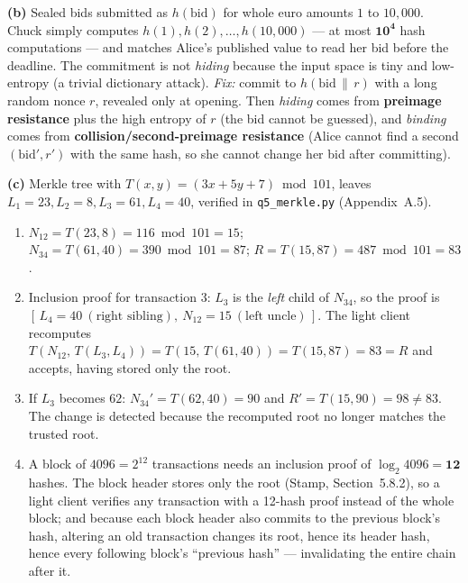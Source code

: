 \documentclass[11pt,a4paper]{article}
\begin{document}
\textbf{(b)} Sealed bids submitted as $h(\text{bid})$ for whole euro amounts $1$ to $10{,}000$. Chuck
simply computes $h(1),h(2),\dots,h(10{,}000)$ --- at most $\mathbf{10^{4}}$ hash computations --- and
matches Alice's published value to read her bid before the deadline. The commitment is not
\emph{hiding} because the input space is tiny and low-entropy (a trivial dictionary attack). \emph{Fix:}
commit to $h(\text{bid}\,\|\,r)$ with a long random nonce $r$, revealed only at opening. Then
\emph{hiding} comes from \textbf{preimage resistance} plus the high entropy of $r$ (the bid cannot be
guessed), and \emph{binding} comes from \textbf{collision/second-preimage resistance} (Alice cannot find
a second $(\text{bid}',r')$ with the same hash, so she cannot change her bid after committing).

\textbf{(c)} Merkle tree with $T(x,y)=(3x+5y+7)\bmod 101$, leaves $L_1{=}23,L_2{=}8,L_3{=}61,L_4{=}40$,
verified in \texttt{q5\_merkle.py} (Appendix~A.5).
\begin{enumerate}[label=(\roman*)]
\item $N_{12}=T(23,8)=116\bmod 101=15$; $N_{34}=T(61,40)=390\bmod 101=87$;
$R=T(15,87)=487\bmod 101=\boxed{83}$.
\item Inclusion proof for transaction 3: $L_3$ is the \emph{left} child of $N_{34}$, so the proof is
$[\,L_4=40\ (\text{right sibling}),\ N_{12}=15\ (\text{left uncle})\,]$. The light client recomputes
$T(N_{12},\,T(L_3,L_4)) = T(15,\,T(61,40)) = T(15,87)=83=R$ and accepts, having stored only the root.
\item If $L_3$ becomes $62$: $N_{34}'=T(62,40)=90$ and $R'=T(15,90)=\boxed{98}\neq 83$. The change is
detected because the recomputed root no longer matches the trusted root.
\item A block of $4096=2^{12}$ transactions needs an inclusion proof of $\log_2 4096 = \mathbf{12}$
hashes. The block header stores only the root (Stamp, Section~5.8.2), so a light client verifies any
transaction with a 12-hash proof instead of the whole block; and because each block header also commits
to the previous block's hash, altering an old transaction changes its root, hence its header hash, hence
every following block's ``previous hash'' --- invalidating the entire chain after it.
\end{enumerate}
\end{document}
